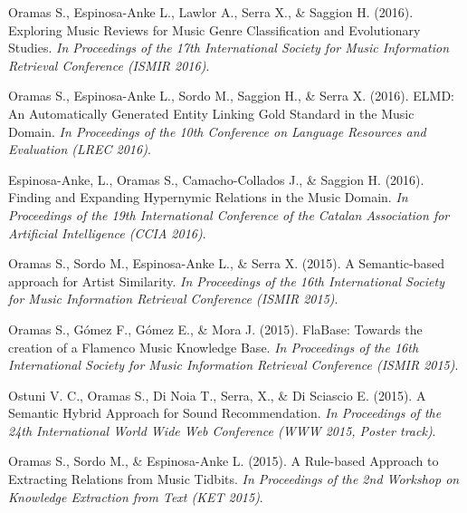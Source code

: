 \vspace{0.2cm}

Oramas S., Espinosa-Anke L., Lawlor A., Serra X., \& Saggion H. (2016). Exploring Music Reviews for Music Genre Classification and Evolutionary Studies. \emph{In Proceedings of the 17th International Society for Music Information Retrieval Conference (ISMIR 2016)}.

\vspace{0.2cm}

Oramas S., Espinosa-Anke L., Sordo M., Saggion H., \& Serra X. (2016). ELMD: An Automatically Generated Entity Linking Gold Standard in the Music Domain. \emph{In Proceedings of the 10th Conference on Language Resources and Evaluation (LREC 2016)}.

\vspace{0.2cm}

Espinosa-Anke, L., Oramas S., Camacho-Collados J., \& Saggion H. (2016). Finding and Expanding Hypernymic Relations in the Music Domain. \emph{In Proceedings of the 19th International Conference of the Catalan Association for Artificial Intelligence (CCIA 2016)}.

\vspace{0.2cm}

Oramas S., Sordo M., Espinosa-Anke L., \& Serra X. (2015). A Semantic-based approach for Artist Similarity. \emph{In Proceedings of the 16th International Society for Music Information Retrieval Conference (ISMIR 2015)}.

\vspace{0.2cm}

Oramas S., Gómez F., Gómez E., \& Mora J. (2015). FlaBase: Towards the creation of a Flamenco Music Knowledge Base. \emph{In Proceedings of the 16th International Society for Music Information Retrieval Conference (ISMIR 2015)}.

\vspace{0.2cm}

Ostuni V. C., Oramas S., Di Noia T., Serra, X., \& Di Sciascio E. (2015). A Semantic Hybrid Approach for Sound Recommendation. \emph{In Proceedings of the 24th International World Wide Web Conference (WWW 2015, Poster track)}.

\vspace{0.2cm}

Oramas S., Sordo M., \& Espinosa-Anke L. (2015). A Rule-based Approach to Extracting Relations from Music Tidbits. \emph{In Proceedings of the 2nd Workshop on Knowledge Extraction from Text (KET 2015)}.

